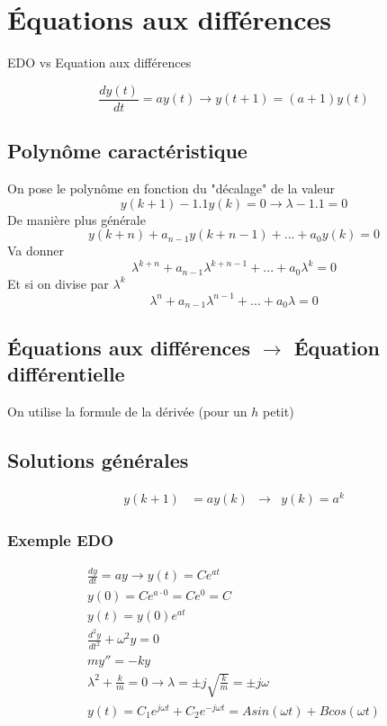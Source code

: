 \documentclass[resume]{subfiles}
\begin{document}
\section{Équations aux différences}

EDO vs Equation aux différences

$$\frac{dy(t)}{dt} = ay(t) \rightarrow y(t+1)=(a+1)y(t)$$


\subsection{Polynôme caractéristique}
On pose le polynôme en fonction du "décalage" de la valeur
$$y(k+1)-1.1y(k)=0\longrightarrow \lambda-1.1=0$$
De manière plus générale
$$y(k + n) + a_{n-1}y(k + n-1) +...+ a_0y(k) = 0$$
Va donner
$$\lambda^{k+n} + a_{n-1}\lambda^{k+n-1} + . . . + a_0\lambda^k = 0$$
Et si on divise par $\lambda^{k}$
$$\lambda^{n} + a_{n-1}\lambda^{n-1} + . . . + a_0\lambda = 0$$



\subsection{Équations aux différences $\longrightarrow$ Équation différentielle}
On utilise la formule de la dérivée (pour un $h$ petit)






\subsection{Solutions générales}
\begin{align*}
y(k+1)&= ay(k) & \longrightarrow & y(k)=a^{k}
\end{align*}





\subsubsection{Exemple EDO}
\begin{multline*}
\frac{dy}{dt} = ay \rightarrow y(t) = Ce^{at}\\
y(0) = Ce^{a\cdot 0} = Ce^0 = C\\
y(t) = y(0)e^{at}\\
\frac{d^2y}{dt^2} + \omega^2y = 0\\
my'' = -ky\\
\lambda^2 + \frac{k}{m}=0 \rightarrow \lambda = \pm j\sqrt{\frac{k}{m}}=\pm j\omega\\
y(t)=C_1 e^{j\omega t}+C_2 e^{-j\omega t} = Asin(\omega t)+Bcos(\omega t)
\end{multline*}
\end{document}
